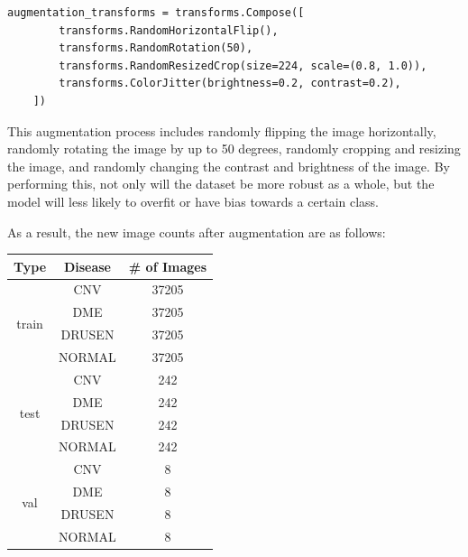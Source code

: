 \documentclass[11pt]{article}
\begin{document}
\begin{lstlisting}
augmentation_transforms = transforms.Compose([
        transforms.RandomHorizontalFlip(),
        transforms.RandomRotation(50),
        transforms.RandomResizedCrop(size=224, scale=(0.8, 1.0)),
        transforms.ColorJitter(brightness=0.2, contrast=0.2),
    ])
\end{lstlisting}

This augmentation process includes randomly flipping the image horizontally, randomly rotating the image by up to 50 degrees, randomly cropping and resizing the image, and randomly changing the contrast and brightness of the image. By performing this, not only will the dataset be more robust as a whole, but the model will less likely to overfit or have bias towards a certain class.

As a result, the new image counts after augmentation are as follows:

\vfill

\begin{center}
    \begin{tabular}{|c|c|c|}
        \hline
        \textbf{Type}          & \textbf{Disease} & \textbf{\# of Images} \\
        \hline
        \multirow{4}{*}{train} & CNV              & 37205                 \\ \cline{2-3}
                               & DME              & 37205                 \\ \cline{2-3}
                               & DRUSEN           & 37205                 \\ \cline{2-3}
                               & NORMAL           & 37205                 \\
        \hline
        \multirow{4}{*}{test}  & CNV              & 242                   \\ \cline{2-3}
                               & DME              & 242                   \\ \cline{2-3}
                               & DRUSEN           & 242                   \\ \cline{2-3}
                               & NORMAL           & 242                   \\
        \hline
        \multirow{4}{*}{val}   & CNV              & 8                     \\ \cline{2-3}
                               & DME              & 8                     \\ \cline{2-3}
                               & DRUSEN           & 8                     \\ \cline{2-3}
                               & NORMAL           & 8                     \\
        \hline
    \end{tabular}
\end{center}
\end{document}
